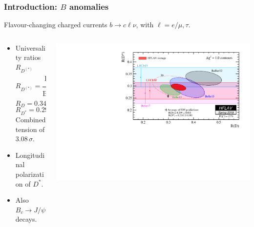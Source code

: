 \documentclass[mathserif, 10pt]{beamer}
\begin{document}
\begin{frame}\frametitle{Introduction: $B$ anomalies}
    Flavour-changing charged currents $b\to c \ell \nu$, with $\ell = e/\mu, \tau$.
    \begin{columns}
        \begin{column}{0.55\textwidth}

            \begin{itemize}
                \item Universality ratios $R_{D^{(*)}}$
                      $$R_{D^{(*)}} = \frac{\mathrm{BR}(B\to D^{(*)}\tau \nu)}{\mathrm{BR}(B\to D^{(*)}\ell \nu)}\,, $$
                      $$R_D = 0.340 \pm 0.027 \pm 0.013\,,$$
                      $$R_{D^*} = 0.295 \pm 0.011 \pm 0.008\,.$$
Combined tension of $3.08\,\sigma$.\footnotemark[2]
                \item Longitudinal polarization of $D^*$.
                \item Also $B_c \to J/\psi \ell\nu$ decays.
            \end{itemize}

        \end{column}
        \begin{column}{0.5\textwidth}
            \includegraphics[width=\columnwidth]{figures/rdrds_spring2019.pdf}
        \end{column}
    \end{columns}
\end{frame}
\end{document}
